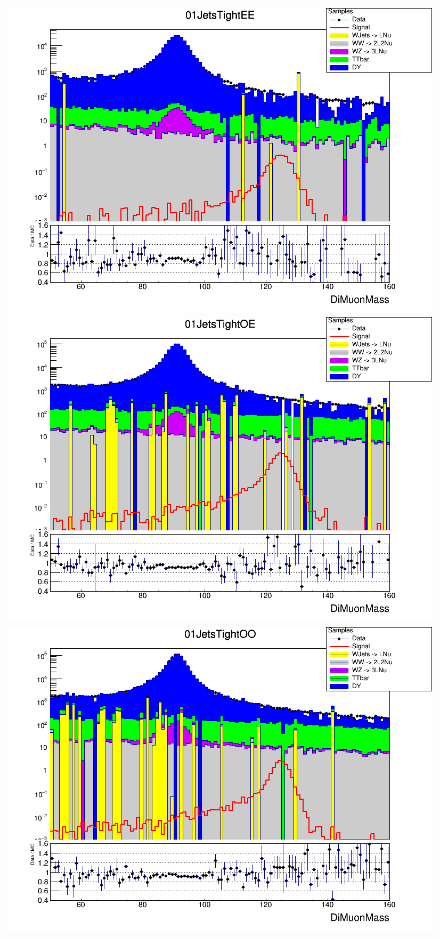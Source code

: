 \begin{figure}[H]
  \centering
  \includegraphics[width=0.65\linewidth]{figures/ch_higgs/distributions/baseline_kalman/distribution__01JetsTightEE__DiMuonMass__logY.png}\\
  \includegraphics[width=0.65\linewidth]{figures/ch_higgs/distributions/baseline_kalman/distribution__01JetsTightOE__DiMuonMass__logY.png}\\
  \includegraphics[width=0.65\linewidth]{figures/ch_higgs/distributions/baseline_kalman/distribution__01JetsTightOO__DiMuonMass__logY.png}
  \caption{}
  \label{fig:higgs_categorization_01jetstighteeeooo}
\end{figure}
